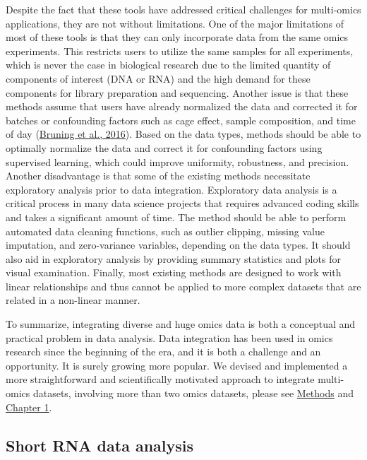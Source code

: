 \documentclass[12pt,twoside]{reedthesis}
\begin{document}
Despite the fact that these tools have addressed critical challenges for
multi-omics applications, they are not without limitations. One of the
major limitations of most of these tools is that they can only
incorporate data from the same omics experiments. This restricts users
to utilize the same samples for all experiments, which is never the case
in biological research due to the limited quantity of components of
interest (DNA or RNA) and the high demand for these components for
library preparation and sequencing. Another issue is that these methods
assume that users have already normalized the data and corrected it for
batches or confounding factors such as cage effect, sample composition,
and time of day (\protect\hyperlink{ref-bruning2016}{Bruning et al., 2016}). Based on the data types, methods should
be able to optimally normalize the data and correct it for confounding
factors using supervised learning, which could improve uniformity,
robustness, and precision. Another disadvantage is that some of the
existing methods necessitate exploratory analysis prior to data
integration. Exploratory data analysis is a critical process in many
data science projects that requires advanced coding skills and takes a
significant amount of time. The method should be able to perform
automated data cleaning functions, such as outlier clipping, missing
value imputation, and zero-variance variables, depending on the data
types. It should also aid in exploratory analysis by providing summary
statistics and plots for visual examination. Finally, most existing
methods are designed to work with linear relationships and thus cannot
be applied to more complex datasets that are related in a non-linear
manner.

To summarize, integrating diverse and huge omics data is both a
conceptual and practical problem in data analysis. Data integration has
been used in omics research since the beginning of the era, and it is
both a challenge and an opportunity. It is surely growing more popular.
We devised and implemented a more straightforward and scientifically
motivated approach to integrate multi-omics datasets, involving more
than two omics datasets, please see \protect\hyperlink{methods}{Methods} and \protect\hyperlink{chapter1}{Chapter 1}.

\hypertarget{short-rna-data-analysis}{%
\subsection*{Short RNA data analysis}\label{short-rna-data-analysis}}
\end{document}
